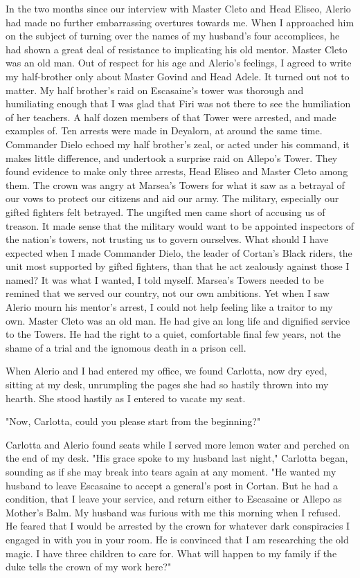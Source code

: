 \documentclass{article}
\begin{document}
In the two months since our interview with Master Cleto and Head Eliseo, Alerio had made no further embarrassing overtures towards me. When I approached him on the subject of turning over the names of my husband's four accomplices, he had shown a great deal of resistance to implicating his old mentor. Master Cleto was an old man. Out of respect for his age and Alerio's feelings, I agreed to write my half-brother only about Master Govind and Head Adele. It turned out not to matter. My half brother's raid on Escasaine's tower was thorough and humiliating enough that I was glad that Firi was not there to see the humiliation of her teachers. A half dozen members of that Tower were arrested, and made examples of. Ten arrests were made in Deyalorn, at around the same time. Commander Dielo echoed my half brother's zeal, or acted under his command, it makes little difference, and undertook a surprise raid on Allepo's Tower. They found evidence to make only three arrests, Head Eliseo and Master Cleto among them. The crown was angry at Marsea's Towers for what it saw as a betrayal of our vows to protect our citizens and aid our army. The military, especially our gifted fighters felt betrayed. The ungifted men came short of accusing us of treason. It made sense that the military would want to be appointed inspectors of the nation's towers, not trusting us to govern ourselves. What should I have expected when I made Commander Dielo, the leader of Cortan's Black riders, the unit most supported by gifted fighters, than that he act zealously against those I named? It was what I wanted, I told myself. Marsea's Towers needed to be remined that we served our country, not our own ambitions. Yet when I saw Alerio mourn his mentor's arrest, I could not help feeling like a traitor to my own. Master Cleto was an old man. He had give an long life and  dignified service to the Towers. He had the right to a quiet, comfortable final few years, not the shame of a trial and the ignomous death in a prison cell.

When Alerio and I had entered my office, we found Carlotta, now dry eyed, sitting at my desk, unrumpling the pages she had so hastily thrown into my hearth. She stood hastily as I entered to vacate my seat.

"Now, Carlotta, could you please start from the beginning?"

Carlotta and Alerio found seats while I served more lemon water and perched on the end of my desk. "His grace spoke to my husband last night," Carlotta began, sounding as if she may break into tears again at any moment. "He wanted my husband to leave Escasaine to accept a general's post in Cortan. But he had a condition, that I leave your service, and return either to Escasaine or Allepo as Mother's Balm. My husband was furious with me this morning when I refused. He feared that I would be arrested by the crown for whatever dark conspiracies I engaged in with you in your room. He is convinced that I am researching the old magic. I have three children to care for. What will happen to my family if the duke tells the crown of my work here?" 
\end{document}
